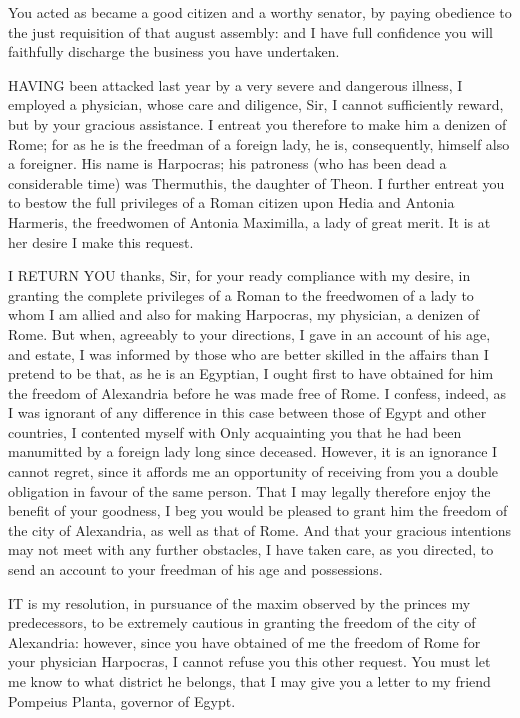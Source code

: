 
You acted as became a good citizen and a worthy senator, by paying
obedience to the just requisition of that august assembly: and I have full
confidence you will faithfully discharge the business you have undertaken.


HAVING been attacked last year by a very severe and dangerous illness, I
employed a physician, whose care and diligence, Sir, I cannot sufficiently
reward, but by your gracious assistance. I entreat you therefore to make
him a denizen of Rome; for as he is the freedman of a foreign lady, he is,
consequently, himself also a foreigner. His name is Harpocras; his
patroness (who has been dead a considerable time) was Thermuthis, the
daughter of Theon. I further entreat you to bestow the full privileges of
a Roman citizen upon Hedia and Antonia Harmeris, the freedwomen of Antonia
Maximilla, a lady of great merit. It is at her desire I make this request.


I RETURN YOU thanks, Sir, for your ready compliance with my desire, in
granting the complete privileges of a Roman to the freedwomen of a lady to
whom I am allied and also for making Harpocras, my physician, a denizen of
Rome. But when, agreeably to your directions, I gave in an account of his
age, and estate, I was informed by those who are better skilled in the
affairs than I pretend to be that, as he is an Egyptian, I ought first to
have obtained for him the freedom of Alexandria before he was made free of
Rome. I confess, indeed, as I was ignorant of any difference in this case
between those of Egypt and other countries, I contented myself with Only
acquainting you that he had been manumitted by a foreign lady long since
deceased. However, it is an ignorance I cannot regret, since it affords me
an opportunity of receiving from you a double obligation in favour of the
same person. That I may legally therefore enjoy the benefit of your
goodness, I beg you would be pleased to grant him the freedom of the city
of Alexandria, as well as that of Rome. And that your gracious intentions
may not meet with any further obstacles, I have taken care, as you
directed, to send an account to your freedman of his age and possessions.


IT is my resolution, in pursuance of the maxim observed by the princes my
predecessors, to be extremely cautious in granting the freedom of the city
of Alexandria: however, since you have obtained of me the freedom of Rome
for your physician Harpocras, I cannot refuse you this other request. You
must let me know to what district he belongs, that I may give you a letter
to my friend Pompeius Planta, governor of Egypt.

